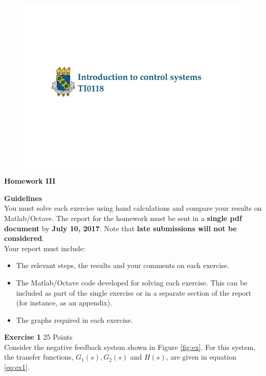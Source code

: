 \documentclass[a4paper,11pt]{article}
\begin{document}
\begin{figure}[!h] \includegraphics [scale=0.3] {Course-name} \end{figure}
{\Large \noindent \bf Homework III} 
\vskip0.8cm

{\Large \noindent \bf Guidelines} \\

\noindent You must solve each exercise using hand calculations and compare your results on Matlab/Octave. The report for the homework must be sent in a {\bf single pdf document} by {\bf July 10, 2017}. Note that {\bf late submissions will not be considered}. \\

\noindent Your report must include:
\begin{itemize}
\item The relevant steps, the results and your comments on each exercise.
\item The Matlab/Octave code developed for solving each exercise. This can be included as part of the single exercise or in a separate section of the report (for instance, as an appendix).
\item The graphs required in each exercise. 
\end{itemize}

\vskip0.8cm

{\Large \noindent \bf Exercise 1} \hfill					25 Points\\

\noindent  Consider the negative feedback system shown in Figure \ref{fig:ex}. For this system, the transfer functions, $G_1(s), G_2(s)$ and $H(s)$, are given in equation \ref{eq:ex1}.
 
\end{document}
